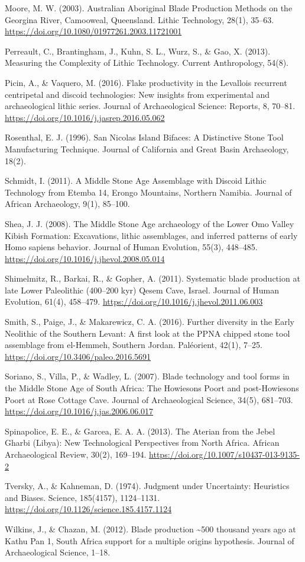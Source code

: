 \documentclass[
]{article}
\begin{document}
Moore, M. W. (2003). Australian Aboriginal Blade Production Methods on
the Georgina River, Camooweal, Queensland. Lithic Technology, 28(1),
35--63. \url{https://doi.org/10.1080/01977261.2003.11721001}

Perreault, C., Brantingham, J., Kuhn, S. L., Wurz, S., \& Gao, X.
(2013). Measuring the Complexity of Lithic Technology. Current
Anthropology, 54(8).

Picin, A., \& Vaquero, M. (2016). Flake productivity in the Levallois
recurrent centripetal and discoid technologies: New insights from
experimental and archaeological lithic series. Journal of Archaeological
Science: Reports, 8, 70--81.
\url{https://doi.org/10.1016/j.jasrep.2016.05.062}

Rosenthal, E. J. (1996). San Nicolas Island Bifaces: A Distinctive Stone
Tool Manufacturing Technique. Journal of California and Great Basin
Archaeology, 18(2).

Schmidt, I. (2011). A Middle Stone Age Assemblage with Discoid Lithic
Technology from Etemba 14, Erongo Mountains, Northern Namibia. Journal
of African Archaeology, 9(1), 85--100.

Shea, J. J. (2008). The Middle Stone Age archaeology of the Lower Omo
Valley Kibish Formation: Excavations, lithic assemblages, and inferred
patterns of early Homo sapiens behavior. Journal of Human Evolution,
55(3), 448--485. \url{https://doi.org/10.1016/j.jhevol.2008.05.014}

Shimelmitz, R., Barkai, R., \& Gopher, A. (2011). Systematic blade
production at late Lower Paleolithic (400--200 kyr) Qesem Cave, Israel.
Journal of Human Evolution, 61(4), 458--479.
\url{https://doi.org/10.1016/j.jhevol.2011.06.003}

Smith, S., Paige, J., \& Makarewicz, C. A. (2016). Further diversity in
the Early Neolithic of the Southern Levant: A first look at the PPNA
chipped stone tool assemblage from el-Hemmeh, Southern Jordan.
Paléorient, 42(1), 7--25. \url{https://doi.org/10.3406/paleo.2016.5691}

Soriano, S., Villa, P., \& Wadley, L. (2007). Blade technology and tool
forms in the Middle Stone Age of South Africa: The Howiesons Poort and
post-Howiesons Poort at Rose Cottage Cave. Journal of Archaeological
Science, 34(5), 681--703.
\url{https://doi.org/10.1016/j.jas.2006.06.017}

Spinapolice, E. E., \& Garcea, E. A. A. (2013). The Aterian from the
Jebel Gharbi (Libya): New Technological Perspectives from North Africa.
African Archaeological Review, 30(2), 169--194.
\url{https://doi.org/10.1007/s10437-013-9135-2}

Tversky, A., \& Kahneman, D. (1974). Judgment under Uncertainty:
Heuristics and Biases. Science, 185(4157), 1124--1131.
\url{https://doi.org/10.1126/science.185.4157.1124}

Wilkins, J., \& Chazan, M. (2012). Blade production \textasciitilde500
thousand years ago at Kathu Pan 1, South Africa support for a multiple
origins hypothesis. Journal of Archaeological Science, 1--18.
\end{document}
